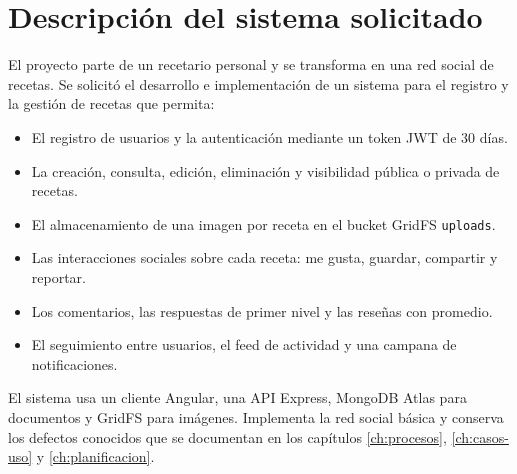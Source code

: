 \chapter{Descripción del sistema solicitado}
\label{ch:descripcion}

El proyecto parte de un recetario personal y se transforma en una red social de recetas. Se solicitó el desarrollo e implementación de un sistema para el registro y la gestión de recetas que permita:

\begin{itemize}[leftmargin=*]
  \item[a.] El registro de usuarios y la autenticación mediante un token JWT de 30 días.
  \item[b.] La creación, consulta, edición, eliminación y visibilidad pública o privada de recetas.
  \item[c.] El almacenamiento de una imagen por receta en el bucket GridFS \texttt{uploads}.
  \item[d.] Las interacciones sociales sobre cada receta: me gusta, guardar, compartir y reportar.
  \item[e.] Los comentarios, las respuestas de primer nivel y las reseñas con promedio.
  \item[f.] El seguimiento entre usuarios, el feed de actividad y una campana de notificaciones.
\end{itemize}

El sistema usa un cliente Angular, una API Express, MongoDB Atlas para documentos y GridFS para imágenes. Implementa la red social básica y conserva los defectos conocidos que se documentan en los capítulos \ref{ch:procesos}, \ref{ch:casos-uso} y \ref{ch:planificacion}.
